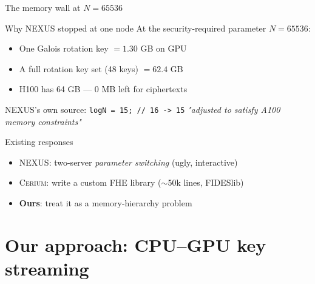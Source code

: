 \documentclass[aspectratio=169]{beamer}
\begin{document}
\begin{frame}{The memory wall at $N{=}65536$}
  \begin{block}{Why NEXUS stopped at one node}
    At the security-required parameter $N{=}65536$:
    \vspace{0.4em}
    \begin{itemize}
      \item One Galois rotation key $= 1.30$ GB on GPU
      \item A full rotation key set (48 keys) $= 62.4$ GB
      \item H100 has 64 GB — \alert{0 MB left for ciphertexts}
    \end{itemize}
    NEXUS's own source: \texttt{logN = 15; // 16 -> 15}
    \footnotesize\color{mutedGray}\emph{"adjusted to satisfy A100 memory constraints"}
  \end{block}
  \pause
  \begin{block}{Existing responses}
    \begin{itemize}
      \item \textsc{NEXUS}: two-server \emph{parameter switching} (ugly, interactive)
      \item \textsc{Cerium}: write a custom FHE library ($\sim$50k lines, FIDESlib)
      \item \textbf{Ours}: treat it as a memory-hierarchy problem
    \end{itemize}
  \end{block}
\end{frame}

\section{Our approach: CPU--GPU key streaming}
\end{document}
